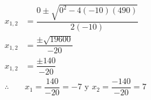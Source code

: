 \begin{solutionbox}{13cm}
\begin{multicols}{2}
\begin{align*}
            x_{1,2}    & = \dfrac{0\pm\sqrt{0^2-4(-10)(490)}}{2(-10)}                  \\[2em]
            x_{1,2}    & = \dfrac{\pm\sqrt{19600}}{-20}                                \\[2em]
            x_{1,2}    & = \dfrac{\pm140}{-20}                                         \\[2em]
            \therefore & x_1 =\dfrac{140}{-20}=-7 \text{ y }  x_2 =\dfrac{-140}{-20}=7 \\[2em]
        \end{align*}
    \end{multicols}
\end{solutionbox}
